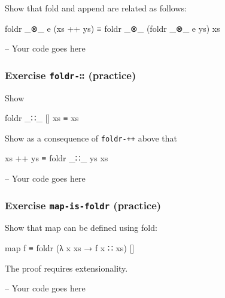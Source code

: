 Show that fold and append are related as follows:

\begin{myDisplay}
foldr _⊗_ e (xs ++ ys) ≡ foldr _⊗_ (foldr _⊗_ e ys) xs
\end{myDisplay}

\begin{fence}
\begin{code}
-- Your code goes here
\end{code}
\end{fence}

\hypertarget{exercise-foldr--practice}{%
\subsubsection{\texorpdfstring{Exercise \texttt{foldr-∷}
(practice)}{Exercise foldr-∷ (practice)}}\label{exercise-foldr--practice}}

Show

\begin{myDisplay}
foldr _∷_ [] xs ≡ xs
\end{myDisplay}

Show as a consequence of \texttt{foldr-++} above that

\begin{myDisplay}
xs ++ ys ≡ foldr _∷_ ys xs
\end{myDisplay}

\begin{fence}
\begin{code}
-- Your code goes here
\end{code}
\end{fence}

\hypertarget{exercise-map-is-foldr-practice}{%
\subsubsection{\texorpdfstring{Exercise \texttt{map-is-foldr}
(practice)}{Exercise map-is-foldr (practice)}}\label{exercise-map-is-foldr-practice}}

Show that map can be defined using fold:

\begin{myDisplay}
map f ≡ foldr (λ x xs → f x ∷ xs) []
\end{myDisplay}

The proof requires extensionality.

\begin{fence}
\begin{code}
-- Your code goes here
\end{code}
\end{fence}


